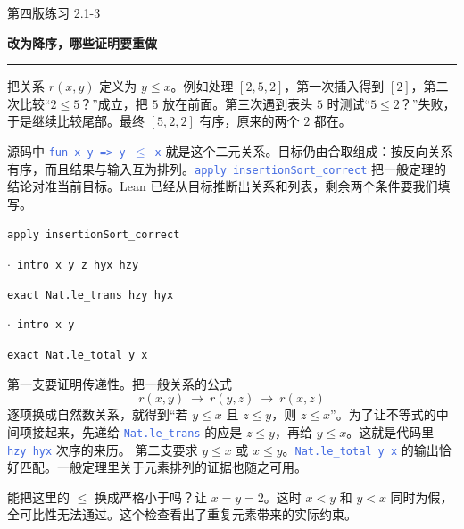 \documentclass[UTF8,11pt,a4paper,fontset=fandol]{ctexart}
\newcommand{\HandoutLesson}[2]{%
  \par{\small\heiti\color{BrickRed}#1}\par\vspace{3pt}
  {\fontsize{21}{27}\selectfont\heiti\bfseries #2}\par
  \textcolor{BrickRed}{\rule{\linewidth}{.7pt}}\par}
\newcommand{\HandoutBox}[1]{%
  \par\noindent\begingroup\setlength{\fboxsep}{8pt}%
  \colorbox{BrickRed!9}{\parbox{\dimexpr\linewidth-16pt\relax}{#1}}\endgroup\par}
\newcommand{\src}[1]{\textcolor{RoyalBlue}{\texttt{#1}}}
\newcommand{\subhead}[1]{\par\vspace{3pt}{\heiti\bfseries\color{RoyalBlue}#1}\par}
\newenvironment{leanblock}{\par\smallskip\noindent\begin{lrbox}{\leanbox}\begin{minipage}{\dimexpr\linewidth-12pt\relax}\raggedright\small\setlength{\parskip}{0pt}}{\end{minipage}\end{lrbox}\colorbox{RoyalBlue!6}{\usebox{\leanbox}}\par\smallskip}
\newcommand{\lineofcode}[2]{\noindent\hspace*{#1em}\strut\texttt{#2}\par}
\begin{document}
\par{}
\clearpage{}\label{p15}\HandoutLesson{第四版练习 2.1-3}{改为降序，哪些证明要重做}
把关系 $r(x,y)$ 定义为 $y\le x$。例如处理 $[2,5,2]$，第一次插入得到 $[2]$，第二次比较“$2\le5$？”成立，把 $5$ 放在前面。第三次遇到表头 $5$ 时测试“$5\le2$？”失败，于是继续比较尾部。最终 $[5,2,2]$ 有序，原来的两个 $2$ 都在。
\subhead{将一般定理用到一个具体关系}
源码中 \src{fun x y => y \ensuremath{\leq} x} 就是这个二元关系。目标仍由合取组成：按反向关系有序，而且结果与输入互为排列。\src{apply insertionSort\_correct} 把一般定理的结论对准当前目标。Lean 已经从目标推断出关系和列表，剩余两个条件要我们填写。
\begin{leanblock}
\lineofcode{1.0}{apply insertionSort\_correct}
\lineofcode{1.0}{\ensuremath{\cdot} intro x y z hyx hzy}
\lineofcode{2.0}{exact Nat.le\_trans hzy hyx}
\lineofcode{1.0}{\ensuremath{\cdot} intro x y}
\lineofcode{2.0}{exact Nat.le\_total y x}
\end{leanblock}
第一支要证明传递性。把一般关系的公式
\[
 r(x,y)\ \longrightarrow\ r(y,z)\ \longrightarrow\ r(x,z)
\]
逐项换成自然数关系，就得到“若 $y\le x$ 且 $z\le y$，则 $z\le x$”。为了让不等式的中间项接起来，先递给 \src{Nat.le\_trans} 的应是 $z\le y$，再给 $y\le x$。这就是代码里 \src{hzy hyx} 次序的来历。
第二支要求 $y\le x$ 或 $x\le y$。\src{Nat.le\_total y x} 的输出恰好匹配。一般定理里关于元素排列的证据也随之可用。
\HandoutBox{能把这里的 $\le$ 换成严格小于吗？让 $x=y=2$。这时 $x<y$ 和 $y<x$ 同时为假，全可比性无法通过。这个检查看出了重复元素带来的实际约束。}
\end{document}
